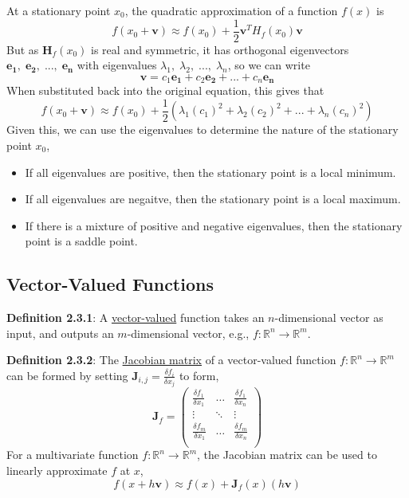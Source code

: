 \documentclass{article}
\newcommand{\separate}[1] {\vspace{#1 pt}\noindent}
\newcommand{\R}{\mathbb{R}}
\newcommand{\hessian}[1]{\mathbf{H}_{#1}}
\newcommand{\jacobian}[1]{\mathbf{J}_{#1}}
\newcommand{\definition}[2]{\textbf{Definition #1}: #2\label{def:#1}}
\begin{document}
\separate{7}At a stationary point \(x_0\), the quadratic approximation of a function \(f(x)\) is
\begin{equation}
    f(x_0 + \mathbf{v}) \approx f(x_0) + \frac{1}{2}\mathbf{v}^T H_f(x_0)\mathbf{v}
\end{equation}
But as \(\hessian{f}(x_0)\) is real and symmetric, it has orthogonal eigenvectors \(\mathbf{e_1},\;\mathbf{e_2},\;...,\;\mathbf{e_n}\) with eigenvalues \(\lambda_1,\;\lambda_2,\;...,\;\lambda_n\), so we can write
\begin{equation}
    \mathbf{v} = c_1\mathbf{e_1} + c_2\mathbf{e_2} + ... + c_n\mathbf{e_n}
\end{equation}
When substituted back into the original equation, this gives that
\begin{equation}
    f(x_0 + \mathbf{v}) \approx f(x_0) + \frac{1}{2}\left(\lambda_1(c_1)^2 + \lambda_2(c_2)^2 + ... + \lambda_n(c_n)^2\right)
\end{equation}
Given this, we can use the eigenvalues to determine the nature of the stationary point \(x_0\),
\begin{itemize}
    \item If all eigenvalues are positive, then the stationary point is a local minimum.
    \item If all eigenvalues are negaitve, then the stationary point is a local maximum.
    \item If there is a mixture of positive and negative eigenvalues, then the stationary point is a saddle point.
\end{itemize}

\subsection{Vector-Valued Functions}

\definition{2.3.1}{A \underline{vector-valued} function takes an \(n\)-dimensional vector as input, and outputs an \(m\)-dimensional vector, e.g., \(f:\R^n\rightarrow\R^m\).}

\separate{7}\definition{2.3.2}{The \underline{Jacobian matrix} of a vector-valued function \(f:\R^n\rightarrow\R^m\) can be formed by setting \(\jacobian{i,j} = \frac{\delta f_i}{\delta x_j}\) to form,}
\begin{equation}
    \jacobian{f} = \begin{pmatrix}
        \frac{\delta f_1}{\delta x_1} & \dots & \frac{\delta f_1}{\delta x_n} \\
        \vdots & \ddots & \vdots \\
        \frac{\delta f_m}{\delta x_1} & \dots & \frac{\delta f_m}{\delta x_n} \\
    \end{pmatrix}
\end{equation}
For a multivariate function \(f:\R^n\rightarrow\R^m\), the Jacobian matrix can be used to linearly approximate \(f\) at \(x\),
\begin{equation}
    f(x + h\mathbf{v}) \approx f(x) + \jacobian{f}(x)(h\mathbf{v})
\end{equation} 
\end{document}
